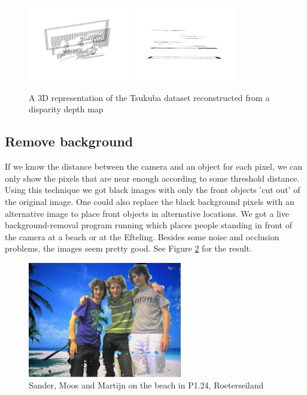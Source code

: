 \documentclass[a4paper]{article}
\begin{document}
\begin{figure}[h!bt]
\centering
\includegraphics[width=0.4\textwidth]{3drep1}
\includegraphics[width=0.4\textwidth]{3drep2}
\caption{A 3D representation of the Tsukuba dataset reconstructed from a
disparity depth map}
\label{3drep}
\end{figure}

\subsection{Remove background}
If we know the distance between the camera and an object for each pixel, we can
only show the pixels that are near enough according to some threshold distance.
Using this technique we got black images with only the front objects 'cut out'
of the original image. One could also replace the black background pixels with
an alternative image to place front objects in alternative locations. We got a
live background-removal program running which places people standing in front of
the camera at a beach or at the Efteling. Besides some noise and occlusion
problems, the images seem pretty good. See Figure \ref{remove-bg} for the
result.

\begin{figure}[h!bt]
\centering
\includegraphics[width=0.6\textwidth]{remove-bg1}
\caption{Sander, Moos and Martijn on the beach in P1.24, Roeterseiland}
\label{remove-bg}
\end{figure}
\end{document}
